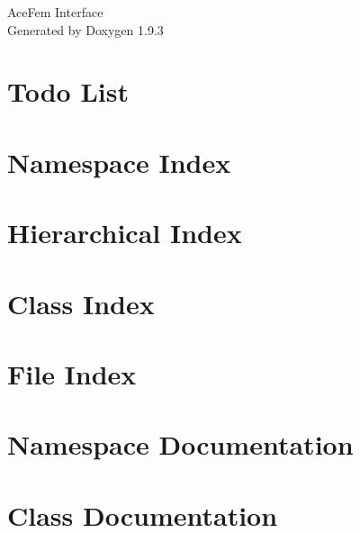 \documentclass[twoside]{book}
\newcommand{\+}{\discretionary{\mbox{\scriptsize$\hookleftarrow$}}{}{}}
\newcommand{\clearemptydoublepage}{%
    \newpage{\pagestyle{empty}\cleardoublepage}%
  }
\begin{document}
  \raggedbottom
    \hypersetup{pageanchor=false,
                bookmarksnumbered=true,
                pdfencoding=unicode
               }
  \begin{titlepage}
  \vspace*{7cm}
  \begin{center}%
  {\Large Ace\+Fem Interface}\\
  \vspace*{1cm}
  {\large Generated by Doxygen 1.9.3}\\
  \end{center}
  \end{titlepage}
  \clearemptydoublepage
  \tableofcontents
  \clearemptydoublepage
  \hypersetup{pageanchor=true}
\chapter{Todo List}
\label{todo}

\chapter{Namespace Index}

\chapter{Hierarchical Index}

\chapter{Class Index}

\chapter{File Index}

\chapter{Namespace Documentation}





\chapter{Class Documentation}








\end{document}
